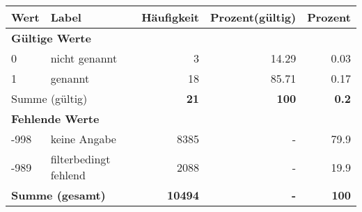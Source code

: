      \begin{longtable}{lXrrr}
     \toprule
     \textbf{Wert} & \textbf{Label} & \textbf{Häufigkeit} & \textbf{Prozent(gültig)} & \textbf{Prozent} \\
     \endhead
     \midrule
     \multicolumn{5}{l}{\textbf{Gültige Werte}}\\

     0 &
     \multicolumn{1}{X}{ nicht genannt   } &


       \num{3} &
       \num[round-mode=places,round-precision=2]{14,29} &
         \num[round-mode=places,round-precision=2]{0,03} \\

     1 &
     \multicolumn{1}{X}{ genannt   } &


       \num{18} &
       \num[round-mode=places,round-precision=2]{85,71} &
         \num[round-mode=places,round-precision=2]{0,17} \\
     \midrule
     \multicolumn{2}{l}{Summe (gültig)} &
       \textbf{\num{21}} &
     \textbf{100} &
       \textbf{\num[round-mode=places,round-precision=2]{0,2}} \\
     \multicolumn{5}{l}{\textbf{Fehlende Werte}}\\
       -998 &
       keine Angabe &
         \num{8385} &
        - &
         \num[round-mode=places,round-precision=2]{79,9} \\
       -989 &
       filterbedingt fehlend &
         \num{2088} &
        - &
         \num[round-mode=places,round-precision=2]{19,9} \\
     \midrule
     \multicolumn{2}{l}{\textbf{Summe (gesamt)}} &
          \textbf{\num{10494}} &
        \textbf{-} &
        \textbf{100} \\
     \bottomrule
     \end{longtable}
     
